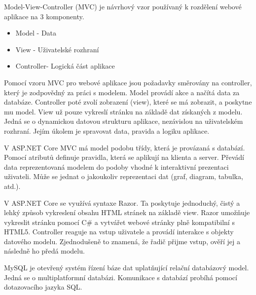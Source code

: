\documentclass[a4paper, 12pt]{report}
\begin{document}
		Model-View-Controller (MVC) je návrhový vzor používaný k rozdělení webové aplikace na 3 komponenty.
		\begin{itemize}
			\item Model - Data
			\item View - Uživatelské rozhraní
			\item Controller- Logická část aplikace
		\end{itemize}
		Pomocí vzoru MVC pro webové aplikace jsou požadavky směrovány na controller, který je zodpovědný za práci s modelem. Model provádí akce a načítá data za databáze. Controller poté zvolí zobrazení (view), které se má zobrazit, a poskytne mu model. View už pouze vykreslí stránku na základě dat získaných z modelu.
		\cite{MVC}
				Jedná se o dynamickou datovou strukturu aplikace, nezávislou na uživatelském rozhraní. Jejím úkolem je spravovat data, pravida a logiku aplikace. \par
				V ASP.NET Core MVC má model podobu třídy, která je provázaná s databází. Pomocí atributů definuje pravidla, která se aplikují na klienta a server.
				\cite{MVC_Wiki_EN}
				Převádí data reprezentovaná modelem do podoby vhodné k interaktivní prezentaci uživateli.\cite{MVC_Wiki_CZ} Může se jednat o jakoukoliv reprezentaci dat (graf, diagram, tabulka, atd.). \par
				V ASP.NET Core se využívá syntaxe Razor. Ta poskytuje jednoduchý, čistý a lehký způsob vykreslení obsahu HTML stránek na základě view. Razor umožňuje vykreslit stránku pomocí C\# a vytvářet webové stránky plně kompatibilní s HTML5.
				\cite{MVC_Wiki_EN}
				Controller reaguje na vstup uživatele a provádí interakce s objekty datového modelu. Zjednodušeně to znamená, že řadič přijme vstup, ověří jej a následně ho předá modelu.
				\cite{MVC_Wiki_EN}

		MySQL je otevřený systém řízení báze dat uplatňující relační databázový model. Jedná se o multiplatformní databázi. Komunikace s databází probíhá pomocí dotazovacího jazyka SQL.
		\cite{MySQL_Wiki_CZ}


	\seznamTabulek
	
	\seznamObrazku
	

	
	

\end{document}
